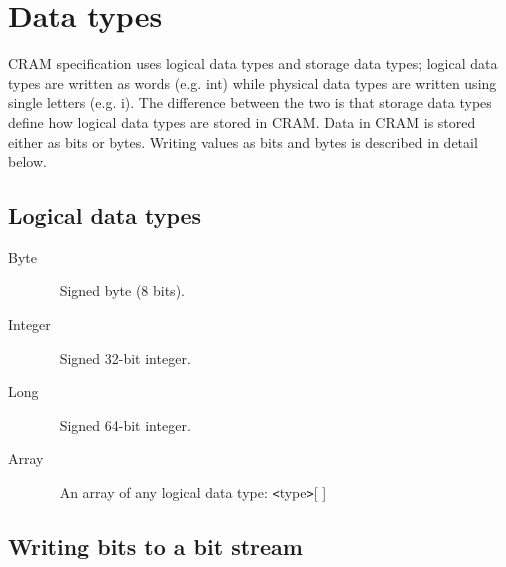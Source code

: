 \documentclass[a4paper]{article}
\begin{document}
\section{\textbf{Data types}}

CRAM specification uses logical data types and storage data types; logical data 
types are written as words (e.g. int) while physical data types are written using 
single letters (e.g. i). The difference between the two is that storage data types 
define how logical data types are stored in CRAM. Data in CRAM is stored either 
as bits or bytes. Writing values as bits and bytes is described in detail 
below.

\subsection{\textbf{Logical data types}}

\begin{description}
\item[Byte]\ \newline
Signed byte (8 bits).

\item[Integer]\ \newline
Signed 32-bit integer. 

\item[Long]\ \newline
Signed 64-bit integer. 

\item[Array]\ \newline
An array of any logical data type: \texttt{<}type\texttt{>}[ ] 
\end{description}


\subsection{\textbf{Writing bits to a bit stream}}
\end{document}
